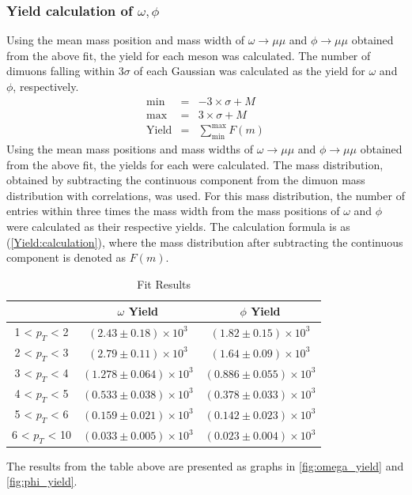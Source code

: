         \subsubsection{Yield calculation of $\omega,\phi$} 
            Using the mean mass position and mass width of $\omega \rightarrow \mu\mu$ and $\phi \rightarrow \mu\mu$ obtained from the above fit, the yield for each meson was calculated. The number of dimuons falling within 3$\sigma$ of each Gaussian was calculated as the yield for $\omega$ and $\phi$, respectively.
            \begin{eqnarray}
                \mathrm{min} &=&  -3 \times \sigma + M \\
                \mathrm{max} &=&  3 \times \sigma + M \\
                \mathrm{Yield} &=& \sum_{\mathrm{min}}^{\mathrm{max}} F(m)
                \label{Yield:calculation}
            \end{eqnarray}
            Using the mean mass positions and mass widths of \(\omega \rightarrow \mu\mu\) and \(\phi \rightarrow \mu\mu\) obtained from the above fit, the yields for each were calculated. The mass distribution, obtained by subtracting the continuous component from the dimuon mass distribution with correlations, was used. For this mass distribution, the number of entries within three times the mass width from the mass positions of \(\omega\) and \(\phi\) were calculated as their respective yields. The calculation formula is as (\ref{Yield:calculation}), where the mass distribution after subtracting the continuous component is denoted as \(F(m)\).\@
            \begin{table}[htbp]
                \centering
                \caption{Fit Results}
                \begin{tabular}{|c||c|c|}
                    \hline
                    & $\omega$ Yield & $\phi$ Yield \\ \hline \hline
                    1 < $p_{T}$ < 2 &$(2.43\pm0.18)\times10^3$& $(1.82\pm0.15)\times10^3$\\ \hline
                    2 < $p_{T}$ < 3 &$(2.79\pm0.11)\times10^3$& $(1.64\pm0.09)\times10^3$\\ \hline
                    3 < $p_{T}$ < 4 &$(1.278\pm0.064)\times10^3$& $(0.886\pm0.055)\times10^3$\\ \hline
                    4 < $p_{T}$ < 5 &$(0.533\pm0.038)\times10^3$& $(0.378\pm0.033)\times10^3$\\ \hline
                    5 < $p_{T}$ < 6 &$(0.159\pm0.021)\times10^3$& $(0.142\pm0.023)\times10^3$\\ \hline
                    6 < $p_{T}$ < 10 &$(0.033\pm0.005)\times10^3$& $(0.023\pm0.004)\times10^3$\\ \hline     
                \end{tabular}
                \label{Analysis:Dimuon:Yield:Results}
            \end{table}
            The results from the table above are presented as graphs in \ref{fig:omega_yield} and \ref{fig:phi_yield}.

